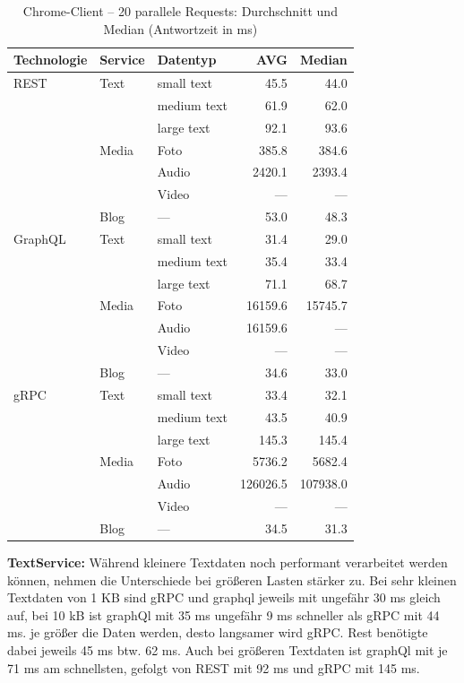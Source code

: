 \begin{table}[h]
	\centering
	\caption{Chrome-Client – 20 parallele Requests: Durchschnitt und Median (Antwortzeit in ms)}
	\label{tab:chrome-20req}
	\renewcommand{\arraystretch}{1.1}
	\begin{tabular}{|l|l|l|r|r|}
		\hline
		\textbf{Technologie} & \textbf{Service} & \textbf{Datentyp} & \textbf{AVG} & \textbf{Median} \\
		\hline
		REST & Text  & small text  & 45.5 & 44.0 \\
		&       & medium text & 61.9 & 62.0 \\
		&       & large text  & 92.1 & 93.6 \\
		& Media & Foto        & 385.8 & 384.6 \\
		&       & Audio       & 2420.1 & 2393.4 \\
		&       & Video       & — & — \\
		& Blog  & —           & 53.0 & 48.3 \\
		\hline
		GraphQL & Text  & small text  & 31.4 & 29.0 \\
		&       & medium text & 35.4 & 33.4 \\
		&       & large text  & 71.1 & 68.7 \\
		& Media & Foto        & 16159.6 & 15745.7 \\
		&       & Audio       & 16159.6 & — \\
		&       & Video       & — & — \\
		& Blog  & —           & 34.6 & 33.0 \\
		\hline
		gRPC & Text  & small text  & 33.4 & 32.1 \\
		&       & medium text & 43.5 & 40.9 \\
		&       & large text  & 145.3 & 145.4 \\
		& Media & Foto        & 5736.2 & 5682.4 \\
		&       & Audio       & 126026.5 & 107938.0 \\
		&       & Video       & — & — \\
		& Blog  & —           & 34.5 & 31.3 \\
		\hline
	\end{tabular}
\end{table}

\clearpage
\textbf{TextService:}  
Während kleinere Textdaten noch performant verarbeitet werden können, nehmen die Unterschiede bei größeren Lasten stärker zu. Bei sehr kleinen Textdaten von 1 KB sind gRPC und graphql jeweils mit ungefähr 30 ms gleich auf, bei 10 kB ist graphQl mit 35 ms ungefähr 9 ms schneller als gRPC mit 44 ms. je größer die Daten werden, desto langsamer wird gRPC. Rest benötigte dabei jeweils 45 ms btw. 62 ms. Auch bei größeren Textdaten ist graphQl mit je 71 ms am schnellsten, gefolgt von REST mit 92 ms und gRPC mit 145 ms. 

